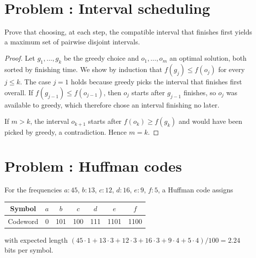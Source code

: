 \documentclass[11pt]{article}
\newcounter{problem}
\newcommand{\problem}[1]{\stepcounter{problem}\section*{Problem \theproblem: #1}}
\begin{document}
\problem{Interval scheduling}

Prove that choosing, at each step, the compatible interval that finishes first yields a maximum set of pairwise disjoint intervals.

\begin{proof}
Let $g_1, \dots, g_k$ be the greedy choice and $o_1, \dots, o_m$ an optimal solution, both sorted by finishing time. We show by induction that $f(g_j) \le f(o_j)$ for every $j \le k$. The case $j = 1$ holds because greedy picks the interval that finishes first overall. If $f(g_{j-1}) \le f(o_{j-1})$, then $o_j$ starts after $g_{j-1}$ finishes, so $o_j$ was available to greedy, which therefore chose an interval finishing no later.

If $m > k$, the interval $o_{k+1}$ starts after $f(o_k) \ge f(g_k)$ and would have been picked by greedy, a contradiction. Hence $m = k$.
\end{proof}

\problem{Huffman codes}

For the frequencies $a\colon 45$, $b\colon 13$, $c\colon 12$, $d\colon 16$, $e\colon 9$, $f\colon 5$, a Huffman code assigns
\begin{center}
  \begin{tabular}{c|cccccc}
    Symbol & $a$ & $b$ & $c$ & $d$ & $e$ & $f$ \\ \hline
    Codeword & 0 & 101 & 100 & 111 & 1101 & 1100
  \end{tabular}
\end{center}
with expected length $(45 \cdot 1 + 13 \cdot 3 + 12 \cdot 3 + 16 \cdot 3 + 9 \cdot 4 + 5 \cdot 4) / 100 = 2.24$ bits per symbol.
\end{document}
